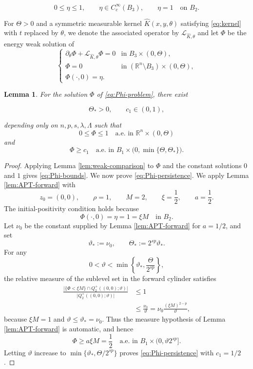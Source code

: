 \documentclass[10pt]{amsart}
\theoremstyle{plain}
\newtheorem{lemma}{Lemma}[section]
\theoremstyle{definition}
\theoremstyle{remark}
\numberwithin{equation}{section}
\newcommand{\R}{\mathbb R}
\begin{document}
\[
    0\le\eta\le1,
    \qquad
    \eta\in C_c^\infty(B_3),
    \qquad
    \eta=1\quad\text{on }B_2.
\]

For $\Theta>0$ and a symmetric measurable kernel $\widehat K(x,y,\theta)$
satisfying \eqref{eq:kernel} with $t$ replaced by $\theta$, we denote
the associated operator by $\mathcal L_{\widehat K,\theta}$ and let
$\Phi$ be the energy weak solution of
\begin{equation}\label{eq:Phi-problem}
\begin{cases}
\partial_\theta\Phi
+\mathcal{L}_{\widehat K,\theta}\Phi=0
&\text{in }B_3\times(0,\Theta),\\
\Phi=0
&\text{in }(\R^n\setminus B_3)\times(0,\Theta),\\
\Phi(\cdot,0)=\eta.
\end{cases}
\end{equation}

\begin{lemma}\label{lem:persistence}
For the solution $\Phi$ of \eqref{eq:Phi-problem}, there exist

\[
    \Theta_*>0,
    \qquad
    c_1\in(0,1),
\]

depending only on $n,p,s,\lambda,\Lambda$ such that
\begin{equation}\label{eq:Phi-bounds}
0\le\Phi\le1
\quad\text{a.e. in }\R^n\times(0,\Theta)
\end{equation}
and
\begin{equation}\label{eq:Phi-persistence}
\Phi\ge c_1
\quad\text{a.e. in }
B_1\times\bigl(0,\min\{\Theta,\Theta_*\}\bigr).
\end{equation}
\end{lemma}

\begin{proof}
Applying Lemma \ref{lem:weak-comparison} to $\Phi$ and the constant
solutions $0$ and $1$ gives \eqref{eq:Phi-bounds}.
We now prove \eqref{eq:Phi-persistence}.
We apply Lemma \ref{lem:APT-forward} with
\[
z_0=(0,0),
\qquad
\rho=1,
\qquad
M=2,
\qquad
\xi=\frac12,
\qquad
a=\frac12.
\]
The initial-positivity condition holds because
\[
\Phi(\cdot,0)=\eta=1=\xi M
\quad\text{in }B_2.
\]
Let $\nu_0$ be the constant supplied by Lemma
\ref{lem:APT-forward} for $a=1/2$, and set
\[
\vartheta_*
:=
\nu_0,
\qquad
\Theta_*:=2^{sp}\vartheta_*.
\]
For any
\[
0<\vartheta
<
\min\left\{\vartheta_*,\frac{\Theta}{2^{sp}}\right\},
\]
the relative measure of the sublevel set in the forward cylinder satisfies
\begin{align*}
\frac{
\bigl|\{\Phi<\xi M\}\cap Q^+_2((0,0);\vartheta)\bigr|
}{
\bigl|Q^+_2((0,0);\vartheta)\bigr|
}
&\le1
\\
&\le
\frac{\nu_0}{\vartheta}
=
\nu_0
\frac{(\xi M)^{2-p}}{\vartheta},
\end{align*}
because $\xi M=1$ and $\vartheta\le\vartheta_*=\nu_0$. Thus the measure
hypothesis of Lemma \ref{lem:APT-forward} is automatic, and hence
\[
\Phi\ge a\xi M=\frac12
\quad\text{a.e. in }
B_1\times(0,\vartheta2^{sp}].
\]
Letting $\vartheta$ increase to
$\min\{\vartheta_*,\Theta/2^{sp}\}$ proves
\eqref{eq:Phi-persistence} with $c_1=1/2$.
\end{proof}
\end{document}
